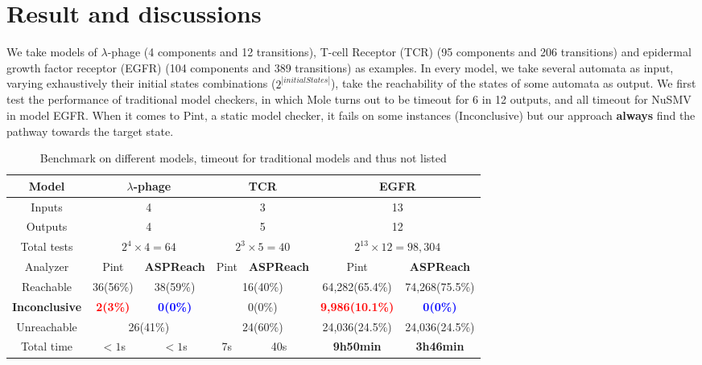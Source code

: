 \documentclass[final]{beamer}
\begin{document}
\begin{frame}[t]{}
\begin{columns}[t]
\begin{column}{.50\linewidth}
\section{Result and discussions}
We take models of $\lambda$-phage \cite{thieffry1995dynamical} (4 components and 12 transitions), T-cell Receptor (TCR) \cite{saez2007logical} (95 components and 206 transitions) and epidermal growth factor receptor (EGFR) (104 components and 389 transitions) \cite{samaga2009logic} as examples. In every model, we take several automata as input, varying exhaustively their initial states combinations ($2^{|initialStates|}$), take the reachability of the states of some automata as output. We first test the performance of traditional model checkers, in which Mole turns out to be timeout for 6 in 12 outputs, and all timeout for NuSMV in model EGFR. When it comes to Pint, a static model checker, it fails on some instances (Inconclusive) but our approach \textbf{always} find the pathway towards the target state.
\begin{table}
\small{
\begin{tabular}{|c|c|c|c|c|c|c|}
    \hline
  	Model	&\multicolumn{2}{c|}{$\lambda$-phage}	&	  \multicolumn{2}{c|}{TCR} & \multicolumn{2}{c|}{EGFR}  \\
    \hline
    Inputs&\multicolumn{2}{c|}{4}	&	  \multicolumn{2}{c|}{3} & \multicolumn{2}{c|}{13}\\
    \hline
    Outputs&\multicolumn{2}{c|}{4} &	  \multicolumn{2}{c|}{5} & \multicolumn{2}{c|}{12} \\
    \hline
    Total tests&\multicolumn{2}{c|}{$2^4\times 4=64$} & \multicolumn{2}{c|}{$2^3\times 5=40$} & \multicolumn{2}{c|}{$2^{13}\times 12=98,304$}\\
    \hline
    Analyzer  &  Pint       &\textbf{ASPReach}    &  Pint       &\textbf{ASPReach}   &  Pint       &\textbf{ASPReach}             \\
    \hline
    Reachable    & 36(56\%)& 38(59\%)   &  \multicolumn{2}{c|}{16(40\%)}  & 64,282(65.4\%)&74,268(75.5\%)\\
    \hline
    \textbf{Inconclusive} & \textcolor{red}{\textbf{2(3\%)}}&\textcolor{blue}{\textbf{0(0\%)}}& \multicolumn{2}{c|}{0(0\%)}    &\textcolor{red}{\textbf{9,986(10.1\%)}}&\textcolor{blue}{\textbf{0(0\%)}}  \\
    \hline
    Unreachable     &  \multicolumn{2}{c|}{26(41\%)} &  \multicolumn{2}{c|}{24(60\%)} &24,036(24.5\%)&24,036(24.5\%)\\
    \hline
    Total time &  $<1$s       &  $<1$s &  7s       &  40s        & \textbf{9h50min}              & \textbf{3h46min}      \\
    \hline
  \end{tabular}
  \caption{Benchmark on different models, timeout for traditional models and thus not listed}
  }
\end{table}


\end{column}
\end{columns}
\end{frame}
\end{document}
